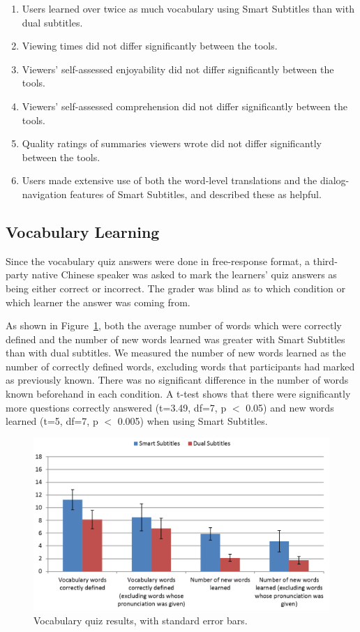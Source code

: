 \documentclass{sigchi}
\begin{document}
\begin{enumerate}[noitemsep]
\item Users learned over twice as much vocabulary using Smart Subtitles than with dual subtitles.
\item Viewing times did not differ significantly between the tools.
\item Viewers' self-assessed enjoyability did not differ significantly between the tools.
\item Viewers' self-assessed comprehension did not differ significantly between the tools.
\item Quality ratings of summaries viewers wrote did not differ significantly
between the tools.
\item Users made extensive use of both the word-level translations and the dialog-navigation features of Smart Subtitles, and described these as helpful.
\end{enumerate}

\subsection{Vocabulary Learning}

Since the vocabulary quiz answers were done in free-response format, a third-party native Chinese speaker was asked to mark the learners' quiz answers as being either correct or incorrect. The grader was blind as to which condition or which learner the answer was coming from.

As shown in Figure~\ref{fig:figure6}, both the average number of words which were correctly defined and the number of new words learned was greater with Smart Subtitles than with dual subtitles. We measured the number of new words learned as the number of correctly defined words, excluding words that participants had marked as previously known. There was no significant difference in the number of words known beforehand in each condition. A t-test shows that there were significantly more questions correctly answered (t=3.49, df=7, p $<$ 0.05) and new words learned (t=5, df=7, p $<$ 0.005) when using Smart Subtitles.

\begin{figure}[!h]
\centering
\includegraphics[width=\columnwidth]{vocab-quiz-results}
\caption{Vocabulary quiz results, with standard error bars.}
\label{fig:figure6}
\end{figure}
\end{document}
